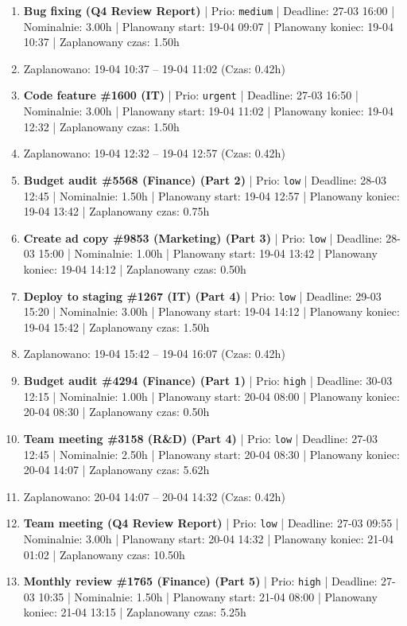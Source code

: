 {\begin{enumerate}
  \item [\textbf{14647}] \textbf{Bug fixing (Q4 Review Report)} | Prio: \texttt{medium} | Deadline: 27-03 16:00 | Nominalnie: 3.00h | Planowany start: 19-04 09:07 | Planowany koniec: 19-04 10:37 | Zaplanowany czas: 1.50h
  \item [\textbf{PRZERWA}] Zaplanowano: 19-04 10:37 -- 19-04 11:02 (Czas: 0.42h)
  \item [\textbf{14605}] \textbf{Code feature \#1600 (IT)} | Prio: \texttt{urgent} | Deadline: 27-03 16:50 | Nominalnie: 3.00h | Planowany start: 19-04 11:02 | Planowany koniec: 19-04 12:32 | Zaplanowany czas: 1.50h
  \item [\textbf{PRZERWA}] Zaplanowano: 19-04 12:32 -- 19-04 12:57 (Czas: 0.42h)
  \item [\textbf{14693}] \textbf{Budget audit \#5568 (Finance) (Part 2)} | Prio: \texttt{low} | Deadline: 28-03 12:45 | Nominalnie: 1.50h | Planowany start: 19-04 12:57 | Planowany koniec: 19-04 13:42 | Zaplanowany czas: 0.75h
  \item [\textbf{14679}] \textbf{Create ad copy \#9853 (Marketing) (Part 3)} | Prio: \texttt{low} | Deadline: 28-03 15:00 | Nominalnie: 1.00h | Planowany start: 19-04 13:42 | Planowany koniec: 19-04 14:12 | Zaplanowany czas: 0.50h
  \item [\textbf{14686}] \textbf{Deploy to staging \#1267 (IT) (Part 4)} | Prio: \texttt{low} | Deadline: 29-03 15:20 | Nominalnie: 3.00h | Planowany start: 19-04 14:12 | Planowany koniec: 19-04 15:42 | Zaplanowany czas: 1.50h
  \item [\textbf{PRZERWA}] Zaplanowano: 19-04 15:42 -- 19-04 16:07 (Czas: 0.42h)
  \item [\textbf{14619}] \textbf{Budget audit \#4294 (Finance) (Part 1)} | Prio: \texttt{high} | Deadline: 30-03 12:15 | Nominalnie: 1.00h | Planowany start: 20-04 08:00 | Planowany koniec: 20-04 08:30 | Zaplanowany czas: 0.50h
  \item [\textbf{14688}] \textbf{Team meeting \#3158 (R\&D) (Part 4)} | Prio: \texttt{low} | Deadline: 27-03 12:45 | Nominalnie: 2.50h | Planowany start: 20-04 08:30 | Planowany koniec: 20-04 14:07 | Zaplanowany czas: 5.62h
  \item [\textbf{PRZERWA}] Zaplanowano: 20-04 14:07 -- 20-04 14:32 (Czas: 0.42h)
  \item [\textbf{14682}] \textbf{Team meeting (Q4 Review Report)} | Prio: \texttt{low} | Deadline: 27-03 09:55 | Nominalnie: 3.00h | Planowany start: 20-04 14:32 | Planowany koniec: 21-04 01:02 | Zaplanowany czas: 10.50h
  \item [\textbf{14627}] \textbf{Monthly review \#1765 (Finance) (Part 5)} | Prio: \texttt{high} | Deadline: 27-03 10:35 | Nominalnie: 1.50h | Planowany start: 21-04 08:00 | Planowany koniec: 21-04 13:15 | Zaplanowany czas: 5.25h
\end{enumerate}
}

